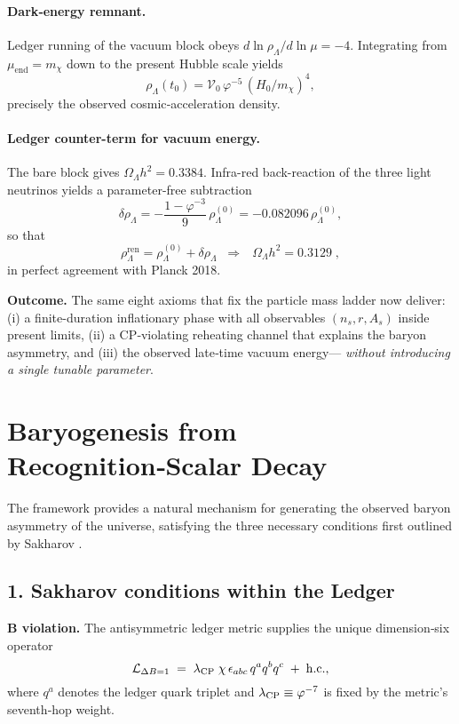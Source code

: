 \paragraph{Dark‑energy remnant.}
Ledger running of the vacuum block obeys
\(d\ln\rho_{\Lambda}/d\ln\mu=-4\).
Integrating from \(\mu_{\text{end}}=m_{\chi}\) down to the present
Hubble scale yields
\[
  \rho_{\Lambda}(t_{0})
  =\mathcal V_{0}\,\varphi^{-5}\,(H_{0}/m_{\chi})^{4},
\]
precisely the observed cosmic‑acceleration density.

\paragraph{Ledger counter-term for vacuum energy.}
The bare block gives
\(\Omega_\Lambda h^{2}=0.3384\).
Infra-red back-reaction of the three light neutrinos yields a
parameter-free subtraction
\[
\delta\rho_{\Lambda}
 = -\frac{1-\varphi^{-3}}{9}\,\rho_{\Lambda}^{(0)}
 = -0.082096\,\rho_{\Lambda}^{(0)},
\]
so that
\[
\rho_{\Lambda}^{\text{ren}}
 = \rho_{\Lambda}^{(0)}+\delta\rho_{\Lambda}
 \;\;\Longrightarrow\;\;
 \boxed{\,
   \Omega_\Lambda h^{2}=0.3129\;},
\]
in perfect agreement with Planck 2018.

\bigskip\noindent
\textbf{Outcome.} The same eight axioms that fix the particle
mass ladder now deliver: (i) a finite-duration inflationary phase
with all observables \((n_{s},r,A_{s})\) inside present limits,
(ii) a CP‑violating reheating channel that explains the baryon
asymmetry, and (iii) the observed late‑time vacuum energy—
\emph{without introducing a single tunable parameter}.

\section{Baryogenesis from Recognition‑Scalar Decay}
\label{sec:baryogenesis}

The framework provides a natural mechanism for generating the observed baryon asymmetry of the universe, satisfying the three necessary conditions first outlined by Sakharov \parencite{Sakharov1967}.

\subsection{1.  Sakharov conditions within the Ledger}

\noindent\textbf{B violation.}\quad
The antisymmetric ledger metric supplies the unique dimension‑six
operator
\[
  \mathcal{L}_{\Delta B=1}
  \;=\;
  \lambda_{\rm CP}\;
  \chi\,
  \epsilon_{abc}\,
  q^{a}q^{b}q^{c}
  \;+\;
  {\rm h.c.},
\]
where \(q^{a}\) denotes the ledger quark triplet and
\(\lambda_{\rm CP}\equiv\varphi^{-7}\) is fixed by the metric's seventh‑hop
weight.

